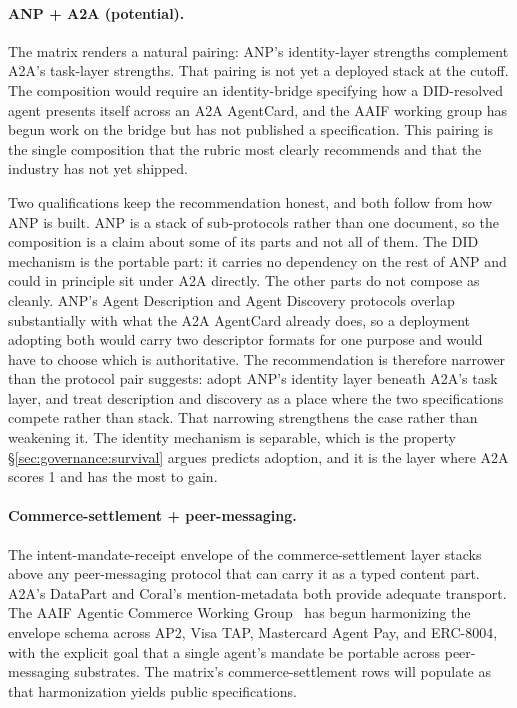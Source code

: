 \paragraph{ANP + A2A (potential).}
The matrix renders a natural pairing: ANP's
identity-layer strengths complement A2A's
task-layer strengths. That pairing is not yet a deployed stack at
the cutoff. The composition would require an
identity-bridge specifying how a DID-resolved agent
presents itself across an A2A AgentCard, and the AAIF
working group has begun work on the bridge but has not
published a specification. This pairing is the
single composition that the rubric most clearly
recommends and that the industry has not yet
shipped.

Two qualifications keep the recommendation honest, and both
follow from how ANP is built. ANP is a stack of
sub-protocols rather than one document, so the composition
is a claim about some of its parts and not all of them. The
DID mechanism is the portable part: it carries no
dependency on the rest of ANP and could in principle sit
under A2A directly. The other parts do not compose as
cleanly. ANP's Agent Description and Agent Discovery
protocols overlap substantially with what the A2A
AgentCard already does, so a deployment adopting both would
carry two descriptor formats for one purpose and would have
to choose which is authoritative. The recommendation is
therefore narrower than the protocol pair suggests: adopt
ANP's identity layer beneath A2A's task layer, and treat
description and discovery as a place where the two
specifications compete rather than stack. That narrowing
strengthens the case rather than weakening it. The
identity mechanism is separable, which is the property
\S\ref{sec:governance:survival} argues predicts adoption,
and it is the layer where A2A scores 1 and has the most
to gain.

\paragraph{Commerce-settlement + peer-messaging.}
The intent-mandate-receipt envelope of the
commerce-settlement layer stacks above any
peer-messaging protocol that can carry it as a typed
content part. A2A's DataPart and Coral's
mention-metadata both provide adequate transport. The
AAIF Agentic Commerce Working
Group~\cite{lf_aaif} has begun harmonizing the
envelope schema across AP2, Visa TAP, Mastercard
Agent Pay, and ERC-8004, with the explicit goal that
a single agent's mandate be portable across
peer-messaging substrates. The matrix's commerce-settlement
rows will populate as that harmonization yields
public specifications.

